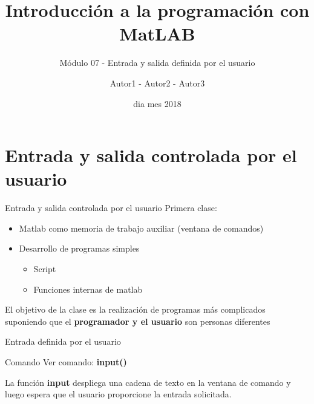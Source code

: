 \documentclass{bredelebeamer}
\title[Programación en MatLAB]{Introducción a la programación con MatLAB}
\subtitle{Módulo 07 - Entrada y salida definida por el usuario}
\author{Autor1 - Autor2 - Autor3\inst{1}}
\institute[UTN.BA]
{
  \inst{1}%
  Universidad Tecnológica Nacional\\
  Facultad Regional Buenos Aires
  }
\date{dia mes 2018}
\begin{document}
\begin{frame}
  \titlepage 
\end{frame}





\section{Entrada y salida controlada por el usuario}

\begin{frame}{Entrada y salida controlada por el usuario}
Primera clase:
\begin{itemize}
\item Matlab como memoria de trabajo auxiliar (ventana de comandos)
\item Desarrollo de programas simples
\begin{itemize}
\item Script
\item Funciones internas de matlab
\end{itemize}
\end{itemize}
El objetivo de la clase es la realización de programas más complicados suponiendo que el \textbf{programador y el usuario} son personas diferentes
\end{frame}

\begin{frame}{Entrada definida por el usuario}
\begin{exampleblock}{Comando}
Ver comando: \textbf{input()}
\end{exampleblock}
La función \textbf{input} despliega una cadena de texto en la ventana de comando y luego espera que el usuario proporcione la entrada solicitada.
\end{frame}
\end{document}
